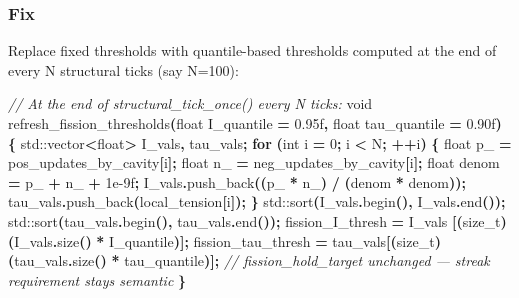 \documentclass[
  11pt,
  a4paper,
]{article}
\newenvironment{Shaded}{\begin{snugshade}}{\end{snugshade}}
\newcommand{\BuiltInTok}[1]{#1}
\newcommand{\CommentTok}[1]{\textcolor[rgb]{0.56,0.35,0.01}{\textit{#1}}}
\newcommand{\ControlFlowTok}[1]{\textcolor[rgb]{0.13,0.29,0.53}{\textbf{#1}}}
\newcommand{\DataTypeTok}[1]{\textcolor[rgb]{0.13,0.29,0.53}{#1}}
\newcommand{\DecValTok}[1]{\textcolor[rgb]{0.00,0.00,0.81}{#1}}
\newcommand{\FloatTok}[1]{\textcolor[rgb]{0.00,0.00,0.81}{#1}}
\newcommand{\NormalTok}[1]{#1}
\newcommand{\OperatorTok}[1]{\textcolor[rgb]{0.81,0.36,0.00}{\textbf{#1}}}
\newcommand{\VariableTok}[1]{\textcolor[rgb]{0.00,0.00,0.00}{#1}}
\begin{document}
\subsubsection{Fix}\label{fix}

Replace fixed thresholds with quantile-based thresholds computed at the
end of every N structural ticks (say N=100):

\begin{Shaded}
\begin{Highlighting}[]
\CommentTok{// At the end of structural\_tick\_once() every N ticks:}
\DataTypeTok{void}\NormalTok{ refresh\_fission\_thresholds}\OperatorTok{(}\DataTypeTok{float}\NormalTok{ I\_quantile }\OperatorTok{=} \FloatTok{0.95}\BuiltInTok{f}\OperatorTok{,}
                                \DataTypeTok{float}\NormalTok{ tau\_quantile }\OperatorTok{=} \FloatTok{0.90}\BuiltInTok{f}\OperatorTok{)}
\OperatorTok{\{}
    \BuiltInTok{std::}\NormalTok{vector}\OperatorTok{\textless{}}\DataTypeTok{float}\OperatorTok{\textgreater{}}\NormalTok{ I\_vals}\OperatorTok{,}\NormalTok{ tau\_vals}\OperatorTok{;}
    \ControlFlowTok{for} \OperatorTok{(}\DataTypeTok{int}\NormalTok{ i }\OperatorTok{=} \DecValTok{0}\OperatorTok{;}\NormalTok{ i }\OperatorTok{\textless{}}\NormalTok{ N}\OperatorTok{;} \OperatorTok{++}\NormalTok{i}\OperatorTok{)} \OperatorTok{\{}
        \DataTypeTok{float} \VariableTok{p\_} \OperatorTok{=}\NormalTok{ pos\_updates\_by\_cavity}\OperatorTok{[}\NormalTok{i}\OperatorTok{];}
        \DataTypeTok{float} \VariableTok{n\_} \OperatorTok{=}\NormalTok{ neg\_updates\_by\_cavity}\OperatorTok{[}\NormalTok{i}\OperatorTok{];}
        \DataTypeTok{float}\NormalTok{ denom }\OperatorTok{=} \VariableTok{p\_} \OperatorTok{+} \VariableTok{n\_} \OperatorTok{+} \FloatTok{1e{-}9}\BuiltInTok{f}\OperatorTok{;}
\NormalTok{        I\_vals}\OperatorTok{.}\NormalTok{push\_back}\OperatorTok{((}\VariableTok{p\_} \OperatorTok{*} \VariableTok{n\_}\OperatorTok{)} \OperatorTok{/} \OperatorTok{(}\NormalTok{denom }\OperatorTok{*}\NormalTok{ denom}\OperatorTok{));}
\NormalTok{        tau\_vals}\OperatorTok{.}\NormalTok{push\_back}\OperatorTok{(}\NormalTok{local\_tension}\OperatorTok{[}\NormalTok{i}\OperatorTok{]);}
    \OperatorTok{\}}
    \BuiltInTok{std::}\NormalTok{sort}\OperatorTok{(}\NormalTok{I\_vals}\OperatorTok{.}\NormalTok{begin}\OperatorTok{(),}\NormalTok{ I\_vals}\OperatorTok{.}\NormalTok{end}\OperatorTok{());}
    \BuiltInTok{std::}\NormalTok{sort}\OperatorTok{(}\NormalTok{tau\_vals}\OperatorTok{.}\NormalTok{begin}\OperatorTok{(),}\NormalTok{ tau\_vals}\OperatorTok{.}\NormalTok{end}\OperatorTok{());}
\NormalTok{    fission\_I\_thresh   }\OperatorTok{=}\NormalTok{ I\_vals  }\OperatorTok{[(}\DataTypeTok{size\_t}\OperatorTok{)(}\NormalTok{I\_vals}\OperatorTok{.}\NormalTok{size}\OperatorTok{()}   \OperatorTok{*}\NormalTok{ I\_quantile}\OperatorTok{)];}
\NormalTok{    fission\_tau\_thresh }\OperatorTok{=}\NormalTok{ tau\_vals}\OperatorTok{[(}\DataTypeTok{size\_t}\OperatorTok{)(}\NormalTok{tau\_vals}\OperatorTok{.}\NormalTok{size}\OperatorTok{()} \OperatorTok{*}\NormalTok{ tau\_quantile}\OperatorTok{)];}
    \CommentTok{// fission\_hold\_target unchanged — streak requirement stays semantic}
\OperatorTok{\}}
\end{Highlighting}
\end{Shaded}
\end{document}
